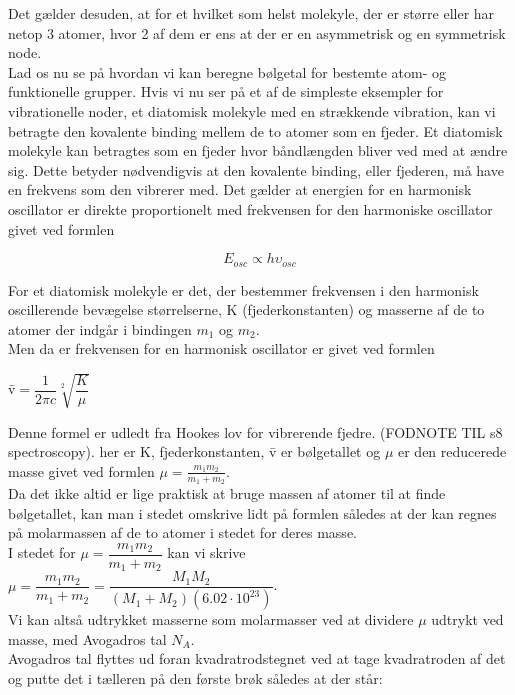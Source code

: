 Det gælder desuden, at for et hvilket som helst molekyle, der er større eller har netop 3 atomer, hvor 2 af dem er ens at der er en asymmetrisk og en symmetrisk node. 
\\

Lad os nu se på hvordan vi kan beregne bølgetal for bestemte atom- og funktionelle grupper. Hvis vi nu ser på et af de simpleste eksempler for vibrationelle noder, et diatomisk molekyle med en strækkende vibration, kan vi betragte den kovalente binding mellem de to atomer som en fjeder. Et diatomisk molekyle kan betragtes som en fjeder hvor båndlængden bliver ved med at ændre sig. Dette betyder nødvendigvis at den kovalente binding, eller fjederen, må have en frekvens som den vibrerer med. Det gælder at energien for en harmonisk oscillator er direkte proportionelt med frekvensen for den harmoniske oscillator givet ved formlen

\begin{center}
\begin{equation}
E_{osc} \propto h \upsilon_{osc}
\end{equation}
\end{center}

For et diatomisk molekyle er det, der bestemmer frekvensen i den harmonisk oscillerende bevægelse størrelserne, K (fjederkonstanten) og masserne af de to atomer der indgår i bindingen $m_1$ og $m_2$.
\\
Men da er frekvensen for en harmonisk oscillator er givet ved formlen

\begin{center}
\={v}$= \dfrac{1}{2 \pi c} \sqrt[2]{\dfrac{K}{\mu}}$
\end{center}

Denne formel er udledt fra Hookes lov for vibrerende fjedre. (FODNOTE TIL s8 spectroscopy). her er K, fjederkonstanten, \={v} er bølgetallet og $\mu$ er den reducerede masse givet ved formlen $\mu = \frac{m_1 m_2}{m_1 + m_2}$. 
\\

Da det ikke altid er lige praktisk at bruge massen af atomer til at finde bølgetallet, kan man i stedet omskrive lidt på formlen således at der kan regnes på molarmassen af de to atomer i stedet for deres masse.
\\
I stedet for $\mu = \dfrac{m_1 m_2}{m_1 + m_2}$ kan vi skrive $\mu = \dfrac{m_1 m_2}{m_1 + m_2} = \dfrac{M_1 M_2}{(M_1 + M_2 ) (6.02 \cdot 10^{23})}$. 
\\
Vi kan altså udtrykket masserne som molarmasser ved at dividere $\mu$ udtrykt ved masse, med Avogadros tal $N_A$.
\\
Avogadros tal flyttes ud foran kvadratrodstegnet ved at tage kvadratroden af det og putte det i tælleren på den første brøk således at der står:

